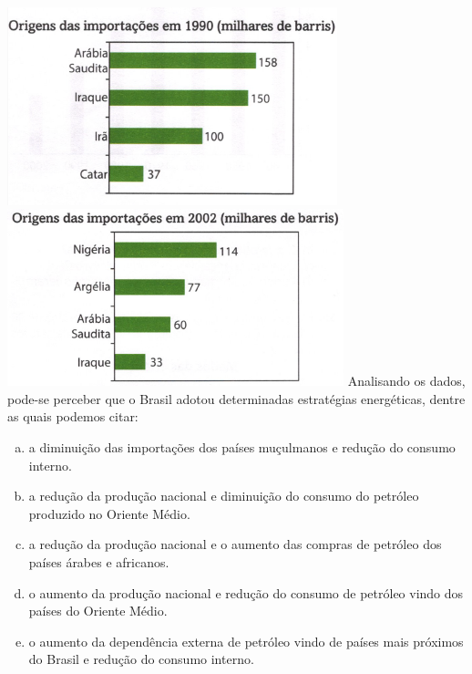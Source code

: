 \documentclass[a4paper,14pt]{article}
\begin{document}
\begin{multicols}{2}
\begin{enumerate}
			\\
			\includegraphics[width=1\linewidth]{6FMA119_imagens/imagem11}
			\\
			\includegraphics[width=1\linewidth]{6FMA119_imagens/imagem12}
			Analisando os dados, pode-se perceber que o Brasil adotou determinadas estratégias energéticas, dentre as quais podemos citar:
			\begin{enumerate}[a)]
				\item a diminuição das importações dos países muçulmanos e redução do consumo interno.
				\item a redução da produção nacional e diminuição do consumo do petróleo produzido no Oriente Médio.
				\item a redução da produção nacional e o aumento das compras de petróleo dos países árabes e africanos.
				\item o aumento da produção nacional e redução do consumo de petróleo vindo dos países do Oriente Médio.
				\item o aumento da dependência externa de petróleo vindo de países mais próximos do Brasil e redução do consumo interno.
			\end{enumerate}

\end{enumerate}
\end{multicols}
\end{document}
